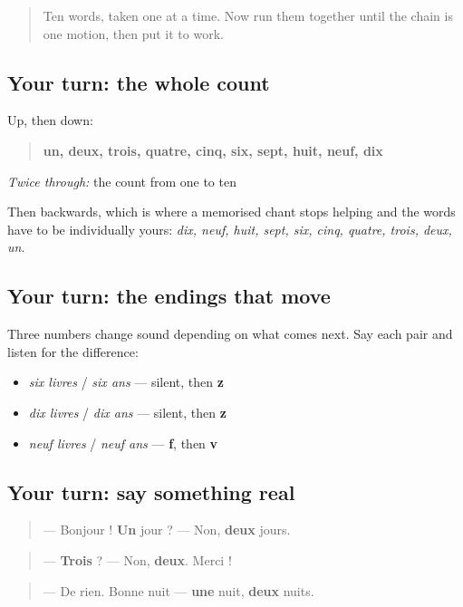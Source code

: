 \label{lesson:FR-C06-practice}



\begin{quote}
Ten words, taken one at a time. Now run them together until the chain is one motion, then put it to work.
\end{quote}

\subsection*{Your turn: the whole count}
Up, then down:

\begin{quote}
\textbf{un, deux, trois, quatre, cinq, six, sept, huit, neuf, dix}
\end{quote}

\emph{Twice through:} the count from one to ten

Then backwards, which is where a memorised chant stops helping and the words have to be individually yours: \emph{dix, neuf, huit, sept, six, cinq, quatre, trois, deux, un}.

\subsection*{Your turn: the endings that move}
Three numbers change sound depending on what comes next. Say each pair and listen for the difference:

\begin{itemize}
\raggedright
  \item \emph{six livres} / \emph{six ans} — silent, then \textbf{z}
  \item \emph{dix livres} / \emph{dix ans} — silent, then \textbf{z}
  \item \emph{neuf livres} / \emph{neuf ans} — \textbf{f}, then \textbf{v}
\end{itemize}

\subsection*{Your turn: say something real}
\begin{quote}
— Bonjour ! \textbf{Un} jour ? — Non, \textbf{deux} jours.
\end{quote}

\begin{quote}
— \textbf{Trois} ? — Non, \textbf{deux}. Merci !
\end{quote}

\begin{quote}
— De rien. Bonne nuit — \textbf{une} nuit, \textbf{deux} nuits.
\end{quote}

